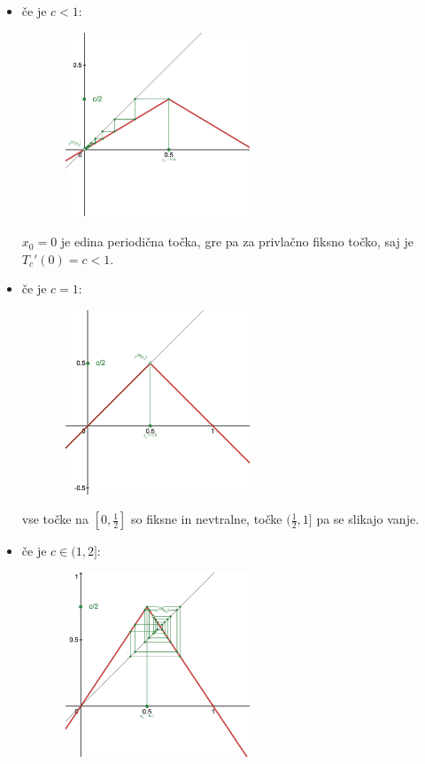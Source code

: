\documentclass{article}
\begin{document}
\begin{itemize}
\item če je $c < 1$: 
\begin{figure}[h!]
    \begin{center}
        \includegraphics[width=6cm, height=5.5cm]{Grafi/cobweb141.png}
    \end{center}
\end{figure} 

$x_0 = 0$ je edina periodična točka, gre pa za privlačno fiksno točko, saj je $T_c'(0) = c < 1$.
\item če je $c = 1$: 
\begin{figure}[h!]
    \begin{center}
        \includegraphics[width=6cm, height=5.5cm]{Grafi/cobweb142.png}
    \end{center}
\end{figure}
vse točke na $[0, \frac{1}{2}]$ so fiksne in nevtralne, točke $(\frac{1}{2}, 1]$ pa se slikajo vanje.
\item če je $c\in (1, 2]$: 
\begin{figure}[h!]
    \begin{center}
        \includegraphics[width=6cm, height=5.5cm]{Grafi/cobweb143.png}
    \end{center}
\end{figure}


\end{itemize}
\end{document}

